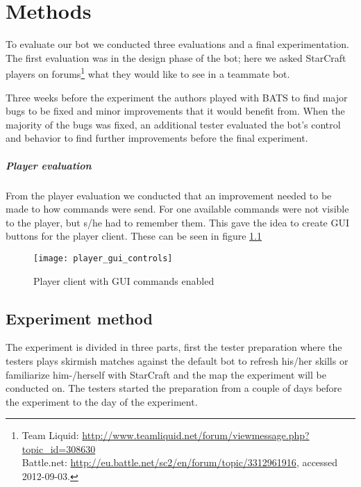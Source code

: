 \chapter{Methods}
To evaluate our bot we conducted three evaluations and a final experimentation. The first evaluation
was in the design phase of the bot; here we asked StarCraft players on forums\footnote{ Team Liquid:
\url{http://www.teamliquid.net/forum/viewmessage.php?topic\_id=308630}\\ Battle.net:
\url{http://eu.battle.net/sc2/en/forum/topic/3312961916}, accessed 2012-09-03.} what they would like
to see in a teammate bot.  

Three weeks before the experiment the authors played with BATS to find major bugs to be fixed and
minor improvements that it would benefit from. When the majority of the bugs was fixed, an additional
tester evaluated the bot’s control and behavior to find further improvements before the final experiment.

\paragraph{Player evaluation}
From the player evaluation we conducted that an improvement needed to be made to how commands were
send. For one available commands were not visible to the player, but s/he had to remember them.
This gave the idea to create GUI buttons for the player client. These can be seen in figure
\ref{fig:player_commands_gui}

\begin{figure}[htb]
\centering
\texttt{[image: player\_gui\_controls]}
\caption{Player client with GUI commands enabled}
\label{fig:player_commands_gui}
\end{figure}

\section{Experiment method}
The experiment is divided in three parts, first the tester preparation where the testers plays
skirmish matches against the default bot to refresh his/her skills or familiarize him-/herself with
StarCraft and the map the experiment will be conducted on. The testers started the preparation
from a couple of days before the experiment to the day of the experiment.

